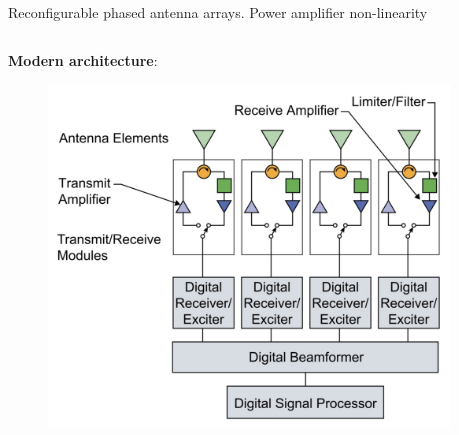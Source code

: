 \documentclass[../main.tex]{subfiles}
\begin{document}
\begin{frame}[t]{Reconfigurable phased antenna arrays. Power amplifier non-linearity}

\begin{columns}[t]
\begin{column}{0.5\textwidth}
    \textbf{Modern architecture}:
    \begin{figure}[H]
        \begin{adjustbox}{width=1\linewidth}
        \includegraphics{pics/antenna_structure.jpg}
        \end{adjustbox}
    \end{figure}
\end{column}
\begin{column}{0.5\textwidth}
\end{column}
\end{columns}
\end{frame}
\end{document}
